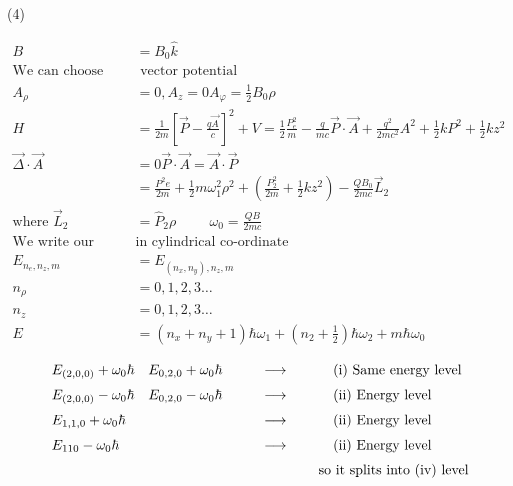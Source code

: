 \begin{enumerate}
 \begin{tasks}(4)
\end{tasks}
\begin{answer}
	\begin{align*}
	B&=B_{0} \hat{k}\\
	\text{We can choose}&\text{ vector potential}\\
	A_{\rho}&=0, A_{z}=0 A_{\varphi}=\frac{1}{2} B_{0} \rho \\
	H&=\frac{1}{2 m}\left[\vec{P}-\frac{q \vec{A}}{c}\right]^{2}+V=\frac{1}{2} \frac{P_{e}^{2}}{m}-\frac{q}{m c} \vec{P} \cdot \vec{A}+\frac{q^{2}}{2 m c^{2}} A^{2}+\frac{1}{2} k P^{2}+\frac{1}{2} k z^{2} \\
	\vec{\Delta} \cdot \vec{A}&=0 \vec{P} \cdot \vec{A}=\vec{A} \cdot \vec{P} \\
	&=\frac{P^{2} e}{2 m}+\frac{1}{2} m \omega_{1}^{2} \rho^{2}+\left(\frac{P_{2}^{2}}{2 m}+\frac{1}{2} k z^{2}\right)-\frac{Q B_{0}}{2 m c} \vec{L}_{2}\\
	\text{where }\vec{L}_{2}&=\hat{P}_{2} \rho\hspace{1cm}
	\omega_{0}=\frac{Q B}{2 m c}\\
	\text{We write our Hamiltonian  }&\text{in cylindrical co-ordinate}\\
	E_{n_{e}, n_{z}, m}&=E_{\left(n_{x}, n_{y}\right), n_{z}, m}\\
	n_{\rho}&=0,1,2,3 \ldots \\
	n_{z}&=0,1,2,3 \ldots \\
	E&=\left(n_{x}+n_{y}+1\right) \hbar \omega_{1}+\left(n_{2}+\frac{1}{2}\right) \hbar \omega_{2}+m \hbar \omega_{0}
	\end{align*}
	\begin{align*}
	\renewcommand*{\arraystretch}{1.5}
	\begin{array}{lll}
E_{(2,0,0)}+\omega_{0} \hbar \quad E_{0,2,0}+\omega_{0} \hbar\qquad &\longrightarrow \qquad &\text { (i) Same energy level }\\
E_{(2,0,0)}-\omega_{0} \hbar \quad E_{0,2,0}-\omega_{0} \hbar \qquad &\longrightarrow \qquad & \text { (ii) Energy level }\\
E_{1,1,0}+\omega_{0} \hbar \qquad &\longrightarrow \qquad &\text { (ii) Energy level }\\
E_{110}-\omega_{0} \hbar \qquad &\longrightarrow \qquad &\text { (ii) Energy level }
	\end{array}\\
	\text { so it splits into (iv) level }

\end{align*}
\end{answer}
\end{enumerate}
